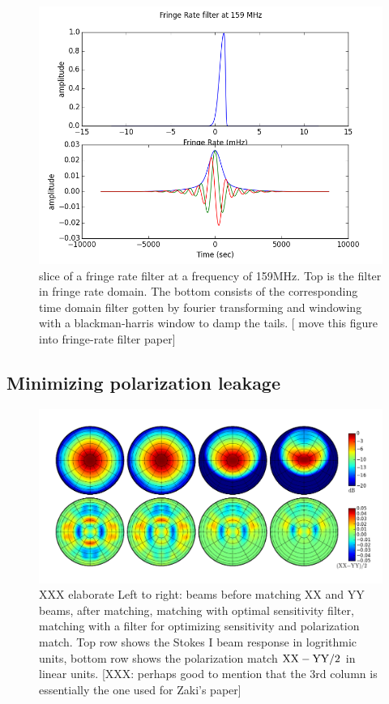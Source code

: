 \documentclass[twocolumn,apj,numberedappendix]{emulateapj}
\begin{document}
\begin{figure}[!t]
\centering
\includegraphics[width=\columnwidth]{plots/fr_filter_slice.png}
\caption{
slice of a fringe rate filter at a frequency of 159MHz. Top is the
filter in fringe rate domain. The bottom consists of the corresponding time
domain filter gotten by fourier transforming and windowing with a
blackman-harris window to damp the tails.
[ move this figure into fringe-rate filter paper]
}
\label{fig:fringe_rate_cut}
\end{figure}


\subsection{Minimizing polarization leakage}
\label{sec:polbeams}
\def\VXX{{V_{\rm XX}}}
\def\VYY{{V_{\rm YY}}}
\def\VI{{V_{\rm I}}}
\def\VQ{{V_{\rm Q}}}

\begin{figure}\centering
\includegraphics[width=1.9\columnwidth]{plots/pol_match.png}
\caption{
XXX elaborate
Left to right: beams before matching XX and YY beams, after matching, matching with optimal sensitivity filter, 
matching with a filter for optimizing sensitivity and polarization match.  Top row shows the Stokes I beam 
response in logrithmic units,
bottom row shows the polarization match ${\rm XX-YY}/2$ in linear units.
[XXX: perhaps good to mention that the 3rd column is essentially the one used for Zaki's paper]
}\label{fig:pol_match}
\end{figure}
\end{document}
